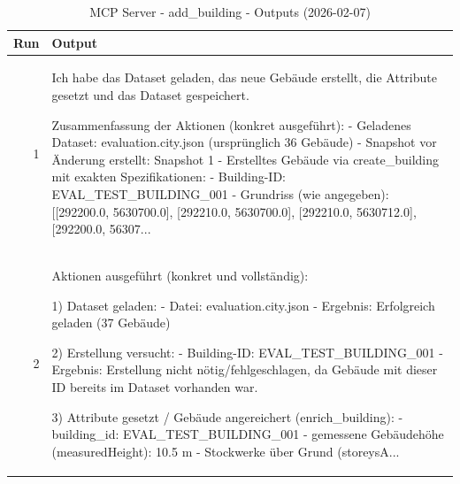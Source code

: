 \documentclass[a4paper,11pt]{article}
\begin{document}
\clearpage

\begin{table}[ht]
\centering
\scriptsize
\caption{MCP Server - add\_building - Outputs (2026-02-07)}
\label{tab:mcp\_add\_building\_outputs\_2026-02-07}
\begin{tabular}{r p{12cm}}
\hline
Run & Output \\
\hline
1 & Ich habe das Dataset geladen, das neue Gebäude erstellt, die Attribute gesetzt und das Dataset gespeichert.

Zusammenfassung der Aktionen (konkret ausgeführt):
- Geladenes Dataset: evaluation.city.json (ursprünglich 36 Gebäude)
- Snapshot vor Änderung erstellt: Snapshot 1
- Erstelltes Gebäude via create\_building mit exakten Spezifikationen:
  - Building-ID: EVAL\_TEST\_BUILDING\_001
  - Grundriss (wie angegeben): [[292200.0, 5630700.0], [292210.0, 5630700.0], [292210.0, 5630712.0], [292200.0, 56307... \\
2 & Aktionen ausgeführt (konkret und vollständig):

1) Dataset geladen:
- Datei: evaluation.city.json
- Ergebnis: Erfolgreich geladen (37 Gebäude)

2) Erstellung versucht:
- Building-ID: EVAL\_TEST\_BUILDING\_001
- Ergebnis: Erstellung nicht nötig/fehlgeschlagen, da Gebäude mit dieser ID bereits im Dataset vorhanden war.

3) Attribute gesetzt / Gebäude angereichert (enrich\_building):
- building\_id: EVAL\_TEST\_BUILDING\_001
- gemessene Gebäudehöhe (measuredHeight): 10.5 m
- Stockwerke über Grund (storeysA... \\
\hline
\end{tabular}
\end{table}

\clearpage
\end{document}
